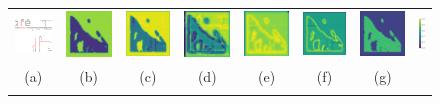 \documentclass[10pt,journal,compsoc]{IEEEtran}
\begin{document}
\begin{figure}[hbt]
	\small
	\setlength{\tabcolsep}{2.0pt}
	\centering
	\begin{tabular}{cccccccc}
		\includegraphics[width=.130\textwidth]{paris/rededge28-1}  &
		\includegraphics[width=.130\textwidth]{paris/lebamforward1}  &
		\includegraphics[width=.130\textwidth]{paris/lebamforward2}  &
		\includegraphics[width=.130\textwidth]{paris/lebamforward3}  &
		\includegraphics[width=.130\textwidth]{paris/lebamreverse3}  &
		\includegraphics[width=.130\textwidth]{paris/lebamreverse2}  &
		\includegraphics[width=.130\textwidth]{paris/lebamreverse1} &
		\includegraphics[height=.130\textwidth]{paris/colorbar}\\
	    \scriptsize{(a)} & \scriptsize{(b)} & \scriptsize{(c)} &\scriptsize{(d)} & \scriptsize{(e)} & \scriptsize{(f)} & \scriptsize{(g)} & \\
		\vspace{-2mm}\\	
	\end{tabular}
	

\end{figure}
\end{document}
